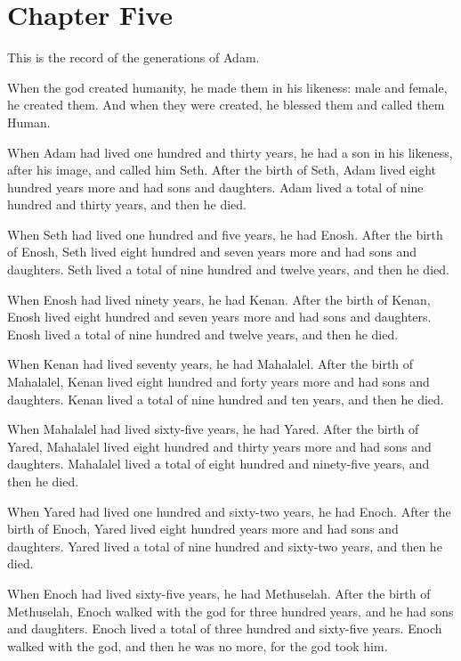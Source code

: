 \chapter*{Chapter Five}

This is the record of the generations of Adam.

When the god created humanity,
he made them in his likeness:
male and female, he created them.
And when they were created,
he blessed them 
and called them Human.

When Adam had lived one hundred and thirty years,
he had a son in his likeness,
after his image, 
and called him Seth.
After the birth of Seth,
Adam lived eight hundred years  more
and had sons and daughters.
Adam lived a total of
nine hundred and thirty years,
and then he died.

When Seth had lived one hundred and five years, 
he had Enosh. 
After the birth of Enosh,
Seth lived eight hundred and seven years more 
and had sons and daughters. 
Seth lived a total of 
nine hundred and twelve years,
and then he died.

When Enosh had lived ninety years, 
he had Kenan. 
After the birth of Kenan,
Enosh lived eight hundred and seven years more 
and had sons and daughters. 
Enosh lived a total of 
nine hundred and twelve years,
and then he died.

When Kenan had lived seventy years,
he had Mahalalel.
After the birth of Mahalalel,
Kenan lived eight hundred and forty years more
and had sons and daughters.
Kenan lived
a total of nine hundred and ten years,
and then he died.

When Mahalalel had lived sixty-five years,
he had Yared.
After the birth of Yared,
Mahalalel lived eight hundred and thirty years more
and had sons and daughters.
Mahalalel lived
a total of eight hundred and ninety-five years,
and then he died.

When Yared had lived one hundred and sixty-two years,
he had Enoch.
After the birth of Enoch,
Yared lived eight hundred years more
and had sons and daughters.
Yared lived
a total of nine hundred and sixty-two years,
and then he died.

When Enoch had lived sixty-five years,
he had Methuselah.
After the birth of Methuselah,
Enoch walked with the god for three hundred years,
and he had sons and daughters.
Enoch lived
a total of three hundred and sixty-five years. 
Enoch walked with the god, 
and then he was no more,
for the god took him.

